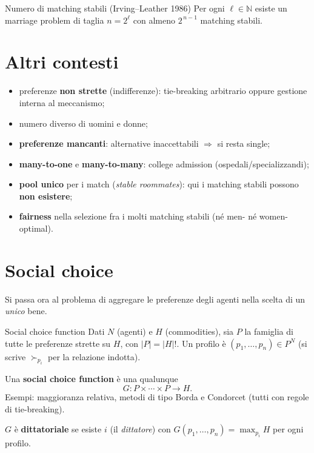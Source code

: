 \documentclass[12pt,a4paper,twoside]{book}
\theoremstyle{plain}
\theoremstyle{definition}
\begin{document}
\begin{thmbox}{Numero di matching stabili (Irving--Leather 1986)}
Per ogni $\ell\in\mathbb{N}$ esiste un marriage problem di taglia $n=2^\ell$ con almeno $2^{\,n-1}$ matching stabili.
\end{thmbox}

\section{Altri contesti}

\begin{itemize}
  \item preferenze \textbf{non strette} (indifferenze): tie-breaking arbitrario oppure gestione interna al meccanismo;
  \item numero diverso di uomini e donne;
  \item \textbf{preferenze mancanti}: alternative inaccettabili $\Rightarrow$ si resta single;
  \item \textbf{many-to-one} e \textbf{many-to-many}: college admission (ospedali/specializzandi);
  \item \textbf{pool unico} per i match (\emph{stable roommates}): qui i matching stabili possono \textbf{non esistere};
  \item \textbf{fairness} nella selezione fra i molti matching stabili (né men- né women-optimal).
\end{itemize}

\section{Social choice}

Si passa ora al problema di aggregare le preferenze degli agenti nella scelta di un \emph{unico} bene.

\begin{defbox}{Social choice function}
Dati $N$ (agenti) e $H$ (commodities), sia $P$ la famiglia di tutte le preferenze strette su $H$, con $|P|=|H|!$. Un profilo è $(p_1,\dots,p_n)\in P^N$ (si scrive $\succ_{p_i}$ per la relazione indotta).

Una \textbf{social choice function} è una qualunque
\[ G:P\times\cdots\times P\longrightarrow H. \]
Esempi: maggioranza relativa, metodi di tipo Borda e Condorcet (tutti con regole di tie-breaking).

$G$ è \textbf{dittatoriale} se esiste $i$ (il \emph{dittatore}) con $G(p_1,\dots,p_n)=\max_{p_i}H$ per ogni profilo.
\end{defbox}
\end{document}

